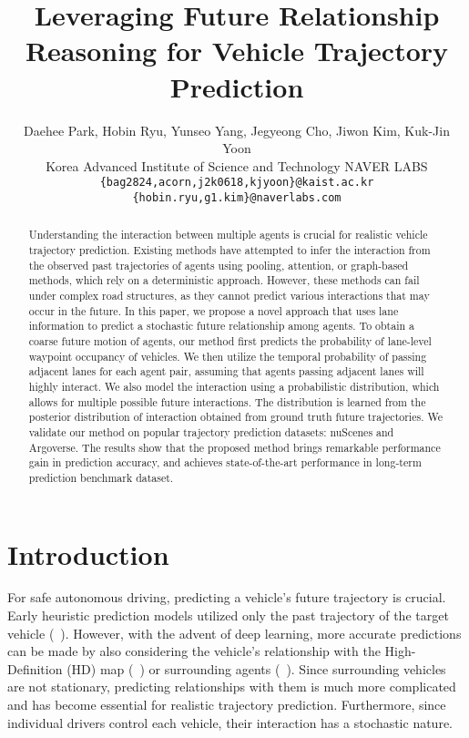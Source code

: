 \documentclass{article} \usepackage{iclr2023_conference,times}
\title{Leveraging Future Relationship Reasoning for Vehicle Trajectory Prediction}
\author{Daehee Park\Mark{1}, Hobin Ryu\Mark{2}, Yunseo Yang\Mark{1}, Jegyeong Cho\Mark{1}, Jiwon Kim\Mark{2}, Kuk-Jin Yoon\Mark{1}\\
\Mark{1}Korea Advanced Institute of Science and Technology \hspace{5mm} \Mark{2}NAVER LABS\\
\texttt{\{bag2824,acorn,j2k0618,kjyoon\}@kaist.ac.kr} \\
\texttt{\{hobin.ryu,g1.kim\}@naverlabs.com} \\
}
\begin{document}
\maketitle

\begin{abstract}
\vspace{-5pt}
Understanding the interaction between multiple agents is crucial for realistic vehicle trajectory prediction. 
Existing methods have attempted to infer the interaction from the observed past trajectories of agents using pooling, attention, or graph-based methods, which rely on a deterministic approach. 
However, these methods can fail under complex road structures, as they cannot predict various interactions that may occur in the future.
In this paper, we propose a novel approach that uses lane information to predict a stochastic future relationship among agents. 
To obtain a coarse future motion of agents, our method first predicts the probability of lane-level waypoint occupancy of vehicles. 
We then utilize the temporal probability of passing adjacent lanes for each agent pair, assuming that agents passing adjacent lanes will highly interact.
We also model the interaction using a probabilistic distribution, which allows for multiple possible future interactions. 
The distribution is learned from the posterior distribution of interaction obtained from ground truth future trajectories.
We validate our method on popular trajectory prediction datasets: nuScenes and Argoverse. 
The results show that the proposed method brings remarkable performance gain in prediction accuracy, and achieves state-of-the-art performance in long-term prediction benchmark dataset.
\vspace{-8pt}
\end{abstract} 

\section{Introduction}
\vspace{-5pt}
For safe autonomous driving, predicting a vehicle's future trajectory is crucial.
Early heuristic prediction models utilized only the past trajectory of the target vehicle (~\cite{lin2000vehicle, barth2008will}).
However, with the advent of deep learning, more accurate predictions can be made by also considering the vehicle's relationship with the High-Definition (HD) map (~\cite{liang2020learning, zeng2021lanercnn}) or surrounding agents (~\cite{lee2017desire, chandra2020forecasting}).
Since surrounding vehicles are not stationary, predicting relationships with them is much more complicated and has become essential for realistic trajectory prediction.
Furthermore, since individual drivers control each vehicle, their interaction has a stochastic nature.
\end{document}
